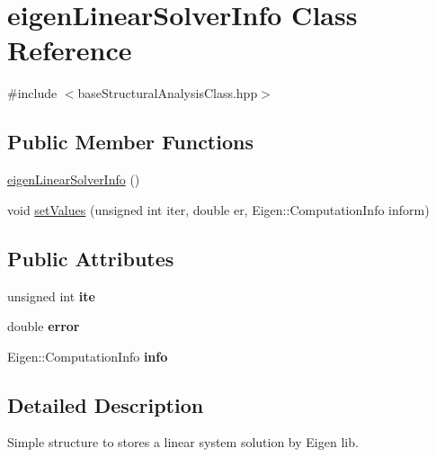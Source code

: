 \hypertarget{classeigen_linear_solver_info}{}\section{eigen\+Linear\+Solver\+Info Class Reference}
\label{classeigen_linear_solver_info}


{\ttfamily \#include $<$base\+Structural\+Analysis\+Class.\+hpp$>$}

\subsection*{Public Member Functions}
\begin{DoxyCompactItemize}
\item 
\mbox{\hyperlink{classeigen_linear_solver_info_afcf78f228707c6145c87916b32e7d6fd}{eigen\+Linear\+Solver\+Info}} ()
\item 
void \mbox{\hyperlink{classeigen_linear_solver_info_ac7e5d54107cd77c21fc6865d3e9f8905}{set\+Values}} (unsigned int iter, double er, Eigen\+::\+Computation\+Info inform)
\end{DoxyCompactItemize}
\subsection*{Public Attributes}
\begin{DoxyCompactItemize}
\item 
\mbox{\label{classeigen_linear_solver_info_ae2702ade4a5a6a9b597621f6ed4079a7}} 
unsigned int {\bfseries ite}
\item 
\mbox{\label{classeigen_linear_solver_info_a752aa62422a4d8ad6cb44d8d56fc6504}} 
double {\bfseries error}
\item 
\mbox{\label{classeigen_linear_solver_info_a1aecf24673f0238af235b3c80f4c89de}} 
Eigen\+::\+Computation\+Info {\bfseries info}
\end{DoxyCompactItemize}


\subsection{Detailed Description}
Simple structure to stores a linear system solution by Eigen lib. 

